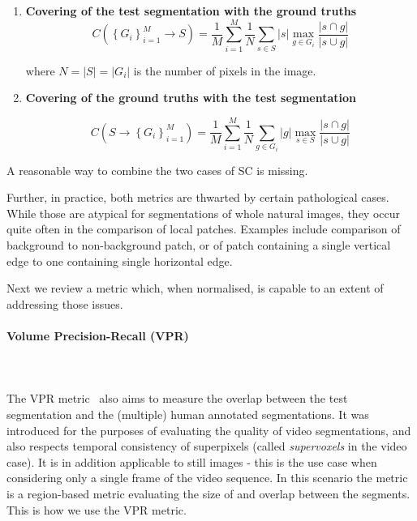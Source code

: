 \begin{enumerate}
\item{\textbf{Covering of the test segmentation with the ground truths}}
\begin{equation}
C\left(\left\{ {G_{i}}\right\} _{i=1}^{M}\longrightarrow S\right)=\frac{1}{M}\sum\limits _{i=1}^{M}\frac{1}{N}\sum\limits _{s\in S}\left|s\right|\max_{g\in G_{i}}\frac{\left|s\cap g\right|}{\left|s\cup g\right|}
\end{equation}

where $N=\left|S\right|=\left|G_{i}\right|$ is the number of pixels in the image.

\item{\textbf{Covering of the ground truths with the test segmentation}}

\begin{equation}
C\left(S\longrightarrow\left\{ {G_{i}}\right\} _{i=1}^{M}\right)=\frac{1}{M}\sum\limits _{i=1}^{M}\frac{1}{N}\sum\limits _{g\in G_{i}}\left|g\right|\max_{s\in S}\frac{\left|s\cap g\right|}{\left|s\cup g\right|}
\end{equation}
\end{enumerate}
A reasonable %
way to combine the two cases of SC is missing.

Further, in practice, both metrics are thwarted by certain pathological cases. While those are atypical for segmentations of whole natural images, they occur quite often in the comparison of local patches. Examples include comparison of background to non-background patch, or of patch containing a single vertical edge to one containing single horizontal edge. 

Next we review a metric which, when normalised, is capable to an extent of addressing those issues.

\paragraph{Volume Precision-Recall (VPR)}\mbox{}\\\mbox{}\\
\label{par:ch4-VPR-maths}
The VPR metric~\cite{Galasso13} also aims to measure the overlap between the test segmentation and the (multiple) human annotated segmentations. It was introduced for the purposes of evaluating the quality of video segmentations, and also respects temporal consistency of superpixels (called \textit{supervoxels} in the video case). It is in addition applicable to %
still images - this is the use case when considering only a single frame of the video sequence. In this scenario the metric is a region-based metric evaluating the size of and overlap between the segments. 
This %
is how we use the VPR metric.

